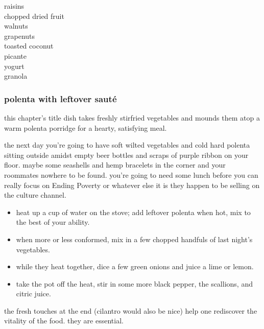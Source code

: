 \mbox{\hskip 1cm}\textsf{raisins}\\
\mbox{\hskip 2.5cm}\textsf{chopped dried fruit}\\
\mbox{\hskip 6cm}\textsf{walnuts}\\
\mbox{\hskip 1.5cm}\textsf{grapenuts}\\
\mbox{\hskip 3.5cm}\textsf{toasted coconut}\\
\mbox{\hskip 7cm}\textsf{picante}\\
\mbox{\hskip 2cm}\textsf{yogurt}\\
\mbox{\hskip 4.5cm}\textsf{granola}

\subsubsection{polenta with leftover saut\'{e}}

this chapter's title dish takes freshly stirfried vegetables and mounds 
them atop a warm polenta porridge for a hearty, satisfying meal.

the next day you're going to have soft wilted vegetables and cold hard 
polenta sitting outside amidst empty beer bottles and scraps of purple 
ribbon on your floor. maybe some seashells and hemp bracelets in the corner 
and your roommates nowhere to be found. you're going to need some lunch 
before you can really focus on Ending Poverty or whatever else it is they 
happen to be selling on the culture channel.

\begin{itemize}

  \item heat up a cup of water on the stove; add leftover polenta when hot, 
  mix to the best of your ability.

  \item when more or less conformed, mix in a few chopped handfuls of last 
  night's vegetables.

  \item while they heat together, dice a few green onions and juice a lime or 
  lemon.

  \item take the pot off the heat, stir in some more black pepper, the 
  scallions, and citric juice.

\end{itemize}

the fresh touches at the end (cilantro would also be nice) help one rediscover 
the vitality of the food. they are essential. 	

